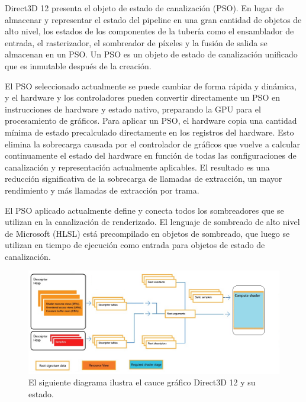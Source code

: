 \documentclass[a4paper, 17pt]{book}
\begin{document}
Direct3D 12 presenta el objeto de estado de canalización (PSO). En lugar de almacenar y representar el estado del pipeline
en una gran cantidad de objetos de alto nivel, los estados de los componentes de la tubería como el ensamblador de entrada,
el rasterizador, el sombreador de píxeles y la fusión de salida se almacenan en un PSO. Un PSO es un objeto de estado de
canalización unificado que es inmutable después de la creación. 

\vspace{1mm} %

El PSO seleccionado actualmente se puede cambiar de forma rápida y dinámica, y el hardware y los controladores pueden
convertir directamente un PSO en instrucciones de hardware y estado nativo, preparando la GPU para el procesamiento
de gráficos. Para aplicar un PSO, el hardware copia una cantidad mínima de estado precalculado directamente en los
registros del hardware. Esto elimina la sobrecarga causada por el controlador de gráficos que vuelve a calcular
continuamente el estado del hardware en función de todas las configuraciones de canalización y representación actualmente
aplicables. El resultado es una reducción significativa de la sobrecarga de llamadas de extracción, un mayor rendimiento
y más llamadas de extracción por trama.

\vspace{1mm} %

El PSO aplicado actualmente define y conecta todos los sombreadores que se utilizan en la canalización de renderizado.
El lenguaje de sombreado de alto nivel de Microsoft (HLSL) está precompilado en objetos de sombreado, que luego se utilizan
en tiempo de ejecución como entrada para objetos de estado de canalización.

\begin{figure}[H]
    \centering
    \includegraphics[scale=0.40, keepaspectratio]{img/compute-pipeline.png}
    \caption{El siguiente diagrama ilustra el cauce gráfico Direct3D 12 y su estado.}
    \label{figura:khronos}
\end{figure}
\end{document}
